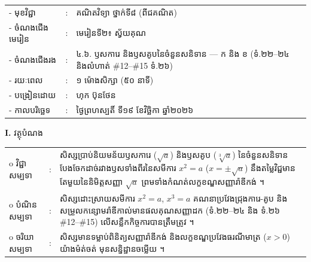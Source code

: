 \documentclass[a4paper,10pt]{article}
\newcommand{\wcirc}{{\CourierBullet\fontsize{9.5pt}{11pt}\selectfont o}}
\begin{document}
{\renewcommand{\arraystretch}{0.98}
\hspace*{3.1cm}%
\begin{tabular}{@{}l l L{11.0cm}@{}}
  - \hspace{0.35cm} មុខវិជ្ជា & : & គណិតវិទ្យា ថ្នាក់ទី៨ (ពីជគណិត) \\
  - \hspace{0.35cm} ចំណងជើងមេរៀន & : & មេរៀនទី២៖ ស្វ័យគុណ \\
  - \hspace{0.35cm} ចំណងជើងរង & : & ៤.៦. ឫសការេ និងឫសគូបនៃចំនួនសនិទាន — ក និង ខ (ទំ.២២–២៤ និងលំហាត់ \#12–\#15 ទំ.២៦) \\
  - \hspace{0.35cm} រយៈពេល & : & ១ ម៉ោងសិក្សា (៥០ នាទី) \\
  - \hspace{0.35cm} បង្រៀនដោយ & : & ហុក ប៊ុនថែន \\
  - \hspace{0.35cm} កាលបរិច្ឆេទ & : & ថ្ងៃព្រហស្បតិ៍ ទី១៩ ខែវិច្ឆិកា ឆ្នាំ២០២៦ \\
\end{tabular}

\vspace{2pt}

\textbf{I.} {\muol វត្ថុបំណង}\\[1pt]
\hspace*{0.55cm}%
\begin{tabular}{@{}l l L{14.2cm}@{}}
  \wcirc \hspace{0.25cm} វិជ្ជាសម្បទា & : & សិស្សប្រាប់និយមន័យឫសការេ ($\sqrt{a}$) និងឫសគូប ($\sqrt[3]{a}$) នៃចំនួនសនិទាន បែងចែកដាច់រវាងឫសទាំងពីរនៃសមីការ $x^2=a$ ($x=\pm\sqrt{a}$) នឹងតម្លៃវិជ្ជមានតែមួយនៃនិមិត្តសញ្ញា $\sqrt{a}$ ព្រមទាំងកំណត់លក្ខខណ្ឌសញ្ញារ៉ាឌីកង់ ។ \\
  \wcirc \hspace{0.25cm} បំណិនសម្បទា & : & សិស្សដោះស្រាយសមីការ $x^2=a$, $x^3=a$ គណនាប្រវែងជ្រុងការេ-គូប និងសម្រួលកន្សោមរ៉ាឌីកាល់មានផលគុណសញ្ញាដក (ទំ.២២–២៤ និង ទំ.២៦ \#12–\#15) លើសន្លឹកកិច្ចការបានត្រឹមត្រូវ ។ \\
  \wcirc \hspace{0.25cm} ចរិយាសម្បទា & : & សិស្សមានទម្លាប់ពិនិត្យសញ្ញារ៉ាឌីកង់ និងលក្ខខណ្ឌប្រវែងធរណីមាត្រ ($x>0$) យ៉ាងម៉ត់ចត់ មុនសន្និដ្ឋានចម្លើយ ។ \\
\end{tabular}

\vspace{2pt}

}
\end{document}
